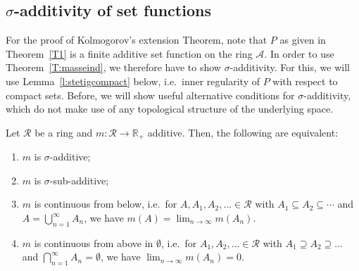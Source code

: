 \documentclass[lean]{AFM}
\begin{document}
\subsection{$\sigma$-additivity of set functions}
For the proof of Kolmogorov's extension Theorem, note that $P$ as
given in Theorem~\ref{T1} is a finite additive set function on the
ring $\mathcal A$. In order to use Theorem~\ref{T:masseind}, we
therefore have to show $\sigma$-additivity. For this, we will use
Lemma~\ref{l:stetigcompact} below, i.e.\ inner regularity of $P$ with
respect to compact sets. Before, we will show useful alternative
conditions for $\sigma$-additivity, which do not make use of any
topological structure of the underlying space.

\begin{lemma}\label{P:stetigmass}
  Let $\mathcal R$ be a ring and $m:\mathcal R\to \mathbb R_+$
  additive. Then, the following are equivalent:
  \begin{enumerate}
    \item $m$ is $\sigma$-additive;
    \item $m$ is $\sigma$-sub-additive;
    \item $m$ is continuous from below, i.e.\ for $A, A_1, A_2,... \in
      \mathcal R$ with $A_1 \subseteq A_2 \subseteq \cdots$ and $A =
      \bigcup_{n=1}^\infty A_n$, we have $m(A) = \lim_{n\to\infty}
      m(A_n)$.
    \item $m$ is continuous from above in $\emptyset$, i.e.\ for $A_1,
      A_2,...\in\mathcal R$ with $A_1 \supseteq A_2 \supseteq ...$ and
      $\bigcap_{n=1}^\infty A_n = \emptyset$, we have
      $\lim_{n\to\infty} m(A_n)=0$.
  \end{enumerate}
\end{lemma}
\end{document}
